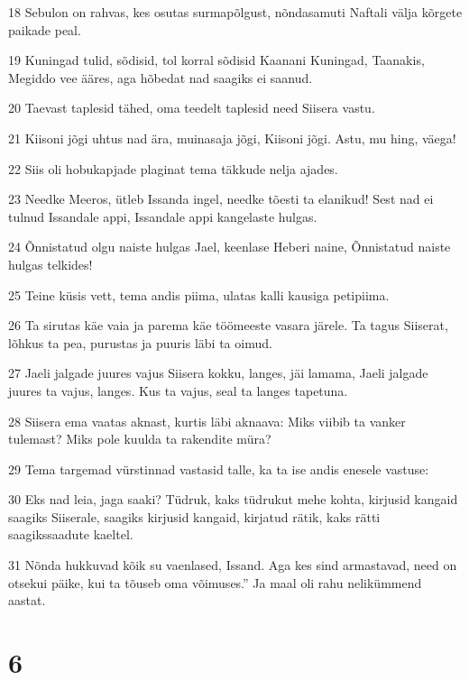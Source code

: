 \par 18 Sebulon on rahvas, kes osutas surmapõlgust, nõndasamuti Naftali välja kõrgete paikade peal.
\par 19 Kuningad tulid, sõdisid, tol korral sõdisid Kaanani Kuningad, Taanakis, Megiddo vee ääres, aga hõbedat nad saagiks ei saanud.
\par 20 Taevast taplesid tähed, oma teedelt taplesid need Siisera vastu.
\par 21 Kiisoni jõgi uhtus nad ära, muinasaja jõgi, Kiisoni jõgi. Astu, mu hing, väega!
\par 22 Siis oli hobukapjade plaginat tema täkkude nelja ajades.
\par 23 Needke Meeros, ütleb Issanda ingel, needke tõesti ta elanikud! Sest nad ei tulnud Issandale appi, Issandale appi kangelaste hulgas.
\par 24 Õnnistatud olgu naiste hulgas Jael, keenlase Heberi naine, Õnnistatud naiste hulgas telkides!
\par 25 Teine küsis vett, tema andis piima, ulatas kalli kausiga petipiima.
\par 26 Ta sirutas käe vaia ja parema käe töömeeste vasara järele. Ta tagus Siiserat, lõhkus ta pea, purustas ja puuris läbi ta oimud.
\par 27 Jaeli jalgade juures vajus Siisera kokku, langes, jäi lamama, Jaeli jalgade juures ta vajus, langes. Kus ta vajus, seal ta langes tapetuna.
\par 28 Siisera ema vaatas aknast, kurtis läbi aknaava: Miks viibib ta vanker tulemast? Miks pole kuulda ta rakendite müra?
\par 29 Tema targemad vürstinnad vastasid talle, ka ta ise andis enesele vastuse:
\par 30 Eks nad leia, jaga saaki? Tüdruk, kaks tüdrukut mehe kohta, kirjusid kangaid saagiks Siiserale, saagiks kirjusid kangaid, kirjatud rätik, kaks rätti saagikssaadute kaeltel.
\par 31 Nõnda hukkuvad kõik su vaenlased, Issand. Aga kes sind armastavad, need on otsekui päike, kui ta tõuseb oma võimuses.” Ja maal oli rahu nelikümmend aastat.

\chapter{6}

